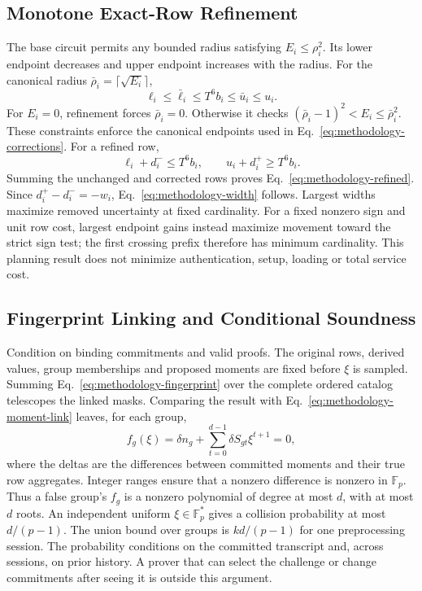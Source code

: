 \documentclass[5p,times,twocolumn]{elsarticle}
\begin{document}
\subsection{Monotone Exact-Row Refinement}
The base circuit permits any bounded radius satisfying $E_i\leq\rho_i^2$.
Its lower endpoint decreases and upper endpoint increases with the radius.
For the canonical radius $\bar\rho_i=\lceil\sqrt{E_i}\rceil$,
\begin{equation}
 \ell_i\leq\bar\ell_i\leq T^6b_i\leq\bar u_i\leq u_i.
\end{equation}
For $E_i=0$, refinement forces $\bar\rho_i=0$. Otherwise it checks
$(\bar\rho_i-1)^2<E_i\leq\bar\rho_i^2$. These constraints enforce the
canonical endpoints used in Eq.~\eqref{eq:methodology-corrections}.
For a refined row,
\begin{equation}
 \ell_i+d_i^-\leq T^6b_i,
 \qquad u_i+d_i^+\geq T^6b_i.
\end{equation}
Summing the unchanged and corrected rows proves Eq.~\eqref{eq:methodology-refined}.
Since $d_i^+-d_i^-=-w_i$, Eq.~\eqref{eq:methodology-width} follows.
Largest widths maximize removed uncertainty at fixed cardinality.
For a fixed nonzero sign and unit row cost, largest endpoint gains instead
maximize movement toward the strict sign test; the first crossing prefix
therefore has minimum cardinality. This planning result does not minimize
authentication, setup, loading or total service cost.

\subsection{Fingerprint Linking and Conditional Soundness}
Condition on binding commitments and valid proofs. The original rows,
derived values, group memberships and proposed moments are fixed before
$\xi$ is sampled. Summing Eq.~\eqref{eq:methodology-fingerprint} over the
complete ordered catalog telescopes the linked masks. Comparing the result
with Eq.~\eqref{eq:methodology-moment-link} leaves, for each group,
\begin{equation}
 f_g(\xi)=\delta n_g+\sum_{t=0}^{d-1}\delta S_{gt}\xi^{t+1}=0,
\end{equation}
where the deltas are the differences between committed moments and their
true row aggregates. Integer ranges ensure that a nonzero difference is
nonzero in $\mathbb F_p$. Thus a false group's $f_g$ is a nonzero polynomial
of degree at most $d$, with at most $d$ roots. An independent uniform
$\xi\in\mathbb F_p^*$ gives a collision probability at most $d/(p-1)$.
The union bound over groups is $kd/(p-1)$ for one preprocessing session.
The probability conditions on the committed transcript and, across
sessions, on prior history. A prover that can select the challenge or
change commitments after seeing it is outside this argument.
\end{document}
